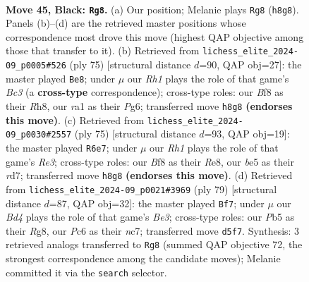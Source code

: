 \documentclass[11pt]{article}
\begin{document}
\clearpage

\begin{figure}[p]\centering
\begin{subfigure}{0.46\textwidth}\centering
\resizebox{\linewidth}{!}{%
\newchessgame
\chessboard[
  setfen={5b1r/1r2k1p1/p1p4p/Pp1bBp2/2p4P/4P1P1/1PK2P1N/R5R1 b - - 7 45},
  showmover=false,
  pgfstyle=straightmove, color=movearrow, markmove={h8-g8}
]}
\caption{}
\end{subfigure}\hfill
\begin{subfigure}{0.46\textwidth}\centering
\resizebox{\linewidth}{!}{%
\newchessgame
\chessboard[
  setfen={7r/2r2p2/k1b1p1p1/1p1pP2p/pP1R1P2/P1P3P1/3KB2P/5R2 b - - 16 38},
  showmover=false,
  pgfstyle=straightmove, color=movearrow, markmove={c6-e8}
]}
\caption{}
\end{subfigure}
\\[4pt]
\begin{subfigure}{0.46\textwidth}\centering
\resizebox{\linewidth}{!}{%
\newchessgame
\chessboard[
  setfen={4r3/3R2p1/2p1rbk1/p4p2/P3p1p1/2P1B1P1/1P1R1P2/5BK1 b - - 5 38},
  showmover=false,
  pgfstyle=straightmove, color=movearrow, markmove={e6-e7}
]}
\caption{}
\end{subfigure}\hfill
\begin{subfigure}{0.46\textwidth}\centering
\resizebox{\linewidth}{!}{%
\newchessgame
\chessboard[
  setfen={6r1/p1N1k3/1p2b2r/2p2pp1/2P1p2p/1PK1P3/P2R1P1R/8 b - - 5 40},
  showmover=false,
  pgfstyle=straightmove, color=movearrow, markmove={e6-f7}
]}
\caption{}
\end{subfigure}
\caption{\textbf{Move 45, Black: \texttt{Rg8}.} (a) Our position; Melanie plays \texttt{Rg8} (\texttt{h8g8}). Panels (b)--(d) are the retrieved master positions whose correspondence most drove this move (highest QAP objective among those that transfer to it). (b) Retrieved from \texttt{lichess\_elite\_2024-09\_p0005\#526} (ply 75) [structural distance $d$=90, QAP obj=27]: the master played \texttt{Be8}; under $\mu$ our \emph{Rh1} plays the role of that game's \emph{Bc3} (a \textbf{cross-type} correspondence); cross-type roles: our \emph{B}f8 as their \emph{R}h8, our \emph{r}a1 as their \emph{P}g6; transferred move \texttt{h8g8} \textbf{(endorses this move)}. (c) Retrieved from \texttt{lichess\_elite\_2024-09\_p0030\#2557} (ply 75) [structural distance $d$=93, QAP obj=19]: the master played \texttt{R6e7}; under $\mu$ our \emph{Rh1} plays the role of that game's \emph{Re3}; cross-type roles: our \emph{B}f8 as their \emph{R}e8, our \emph{b}e5 as their \emph{r}d7; transferred move \texttt{h8g8} \textbf{(endorses this move)}. (d) Retrieved from \texttt{lichess\_elite\_2024-09\_p0021\#3969} (ply 79) [structural distance $d$=87, QAP obj=32]: the master played \texttt{Bf7}; under $\mu$ our \emph{Bd4} plays the role of that game's \emph{Be3}; cross-type roles: our \emph{P}b5 as their \emph{R}g8, our \emph{P}c6 as their \emph{n}c7; transferred move \texttt{d5f7}. Synthesis: 3 retrieved analogs transferred to \texttt{Rg8} (summed QAP objective 72, the strongest correspondence among the candidate moves); Melanie committed it via the \texttt{search} selector.}
\label{fig:thought-m89}
\end{figure}
\end{document}
